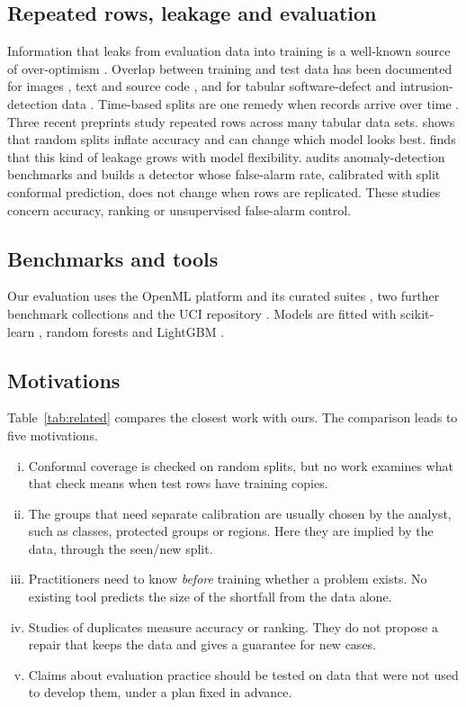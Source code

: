 \subsection{Repeated rows, leakage and evaluation}
Information that leaks from evaluation data into training is a well-known source of over-optimism \citep{kaufman2012,kapoor2023}. Overlap between training and test data has been documented for images \citep{barz2020}, text \citep{lee2022,lewis2021,elangovan2021} and source code \citep{allamanis2019}, and for tabular software-defect and intrusion-detection data \citep{gray2011,shepperd2013,tavallaee2009}. Time-based splits are one remedy when records arrive over time \citep{sheridan2013}. Three recent preprints study repeated rows across many tabular data sets. \citet{li2026} shows that random splits inflate accuracy and can change which model looks best. \citet{roth2026} finds that this kind of leakage grows with model flexibility. \citet{deng2026} audits anomaly-detection benchmarks and builds a detector whose false-alarm rate, calibrated with split conformal prediction, does not change when rows are replicated. These studies concern accuracy, ranking or unsupervised false-alarm control.

\subsection{Benchmarks and tools}
Our evaluation uses the OpenML platform \citep{vanschoren2014} and its curated suites \citep{bischl2021,fischer2023}, two further benchmark collections \citep{gijsbers2024,grinsztajn2022} and the UCI repository \citep{kelly_uci}. Models are fitted with scikit-learn \citep{pedregosa2011}, random forests \citep{breiman2001} and LightGBM \citep{ke2017}.

\subsection{Motivations}
Table~\ref{tab:related} compares the closest work with ours. The comparison leads to five motivations.
\begin{enumerate}[(i)]
\item Conformal coverage is checked on random splits, but no work examines what that check means when test rows have training copies.
\item The groups that need separate calibration are usually chosen by the analyst, such as classes, protected groups or regions. Here they are implied by the data, through the seen/new split.
\item Practitioners need to know \emph{before} training whether a problem exists. No existing tool predicts the size of the shortfall from the data alone.
\item Studies of duplicates measure accuracy or ranking. They do not propose a repair that keeps the data and gives a guarantee for new cases.
\item Claims about evaluation practice should be tested on data that were not used to develop them, under a plan fixed in advance.
\end{enumerate}

